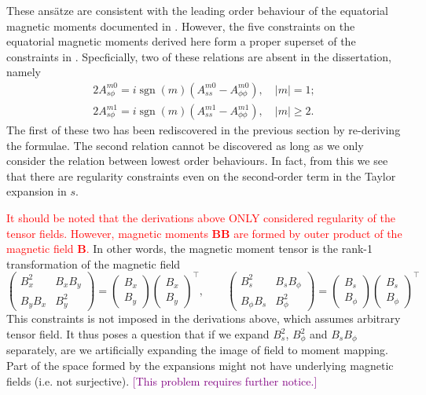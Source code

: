 \documentclass[a4paper, 11pt]{article}
\DeclareMathOperator{\sgn}{sgn}
\newcommand{\todoitem}[1]{\textcolor{purple}{[#1]}}
\begin{document}
These ansätze are consistent with the leading order behaviour of the equatorial magnetic moments documented in \textcite{holdenried-chernoff_long_2021}. However, the five constraints on the equatorial magnetic moments derived here form a proper superset of the constraints in \textcite{holdenried-chernoff_long_2021}. Specficially, two of these relations are absent in the dissertation, namely
\[
\begin{aligned}
    2 A_{s\phi}^{m0} = i\sgn(m) \left(A_{ss}^{m0} - A_{\phi\phi}^{m0}\right),\quad |m|=1;\\
    2A_{s\phi}^{m1} = i\sgn(m) \left(A_{ss}^{m1} - A_{\phi\phi}^{m1}\right),\quad |m|\geq 2.
\end{aligned}
\]
The first of these two has been rediscovered in the previous section by re-deriving the formulae. The second relation cannot be discovered as long as we only consider the relation between lowest order behaviours. In fact, from this we see that there are regularity constraints even on the second-order term in the Taylor expansion in $s$.

\textcolor{red}{It should be noted that the derivations above ONLY considered regularity of the tensor fields. However, magnetic moments $\mathbf{B}\mathbf{B}$ are formed by outer product of the magnetic field $\mathbf{B}$.} In other words, the magnetic moment tensor is the rank-1 transformation of the magnetic field
\[
    \begin{pmatrix} B_x^2 & B_x B_y \\ B_y B_x & B_y^2 \end{pmatrix} = 
    \begin{pmatrix} B_x \\ B_y \end{pmatrix}
    \begin{pmatrix} B_x \\ B_y \end{pmatrix}^\intercal,\qquad
    \begin{pmatrix} B_s^2 & B_s B_\phi \\ B_\phi B_s & B_\phi^2 \end{pmatrix} = 
    \begin{pmatrix} B_s \\ B_\phi \end{pmatrix}
    \begin{pmatrix} B_s \\ B_\phi \end{pmatrix}^\intercal
\]
This constraints is not imposed in the derivations above, which assumes arbitrary tensor field. It thus poses a question that if we expand $B_s^2$, $B_\phi^2$ and $B_sB_\phi$ separately, are we artificially expanding the image of field to moment mapping. Part of the space formed by the expansions might not have underlying magnetic fields (i.e. not surjective). \todoitem{This problem requires further notice.}

\clearpage

\printbibliography
\end{document}
